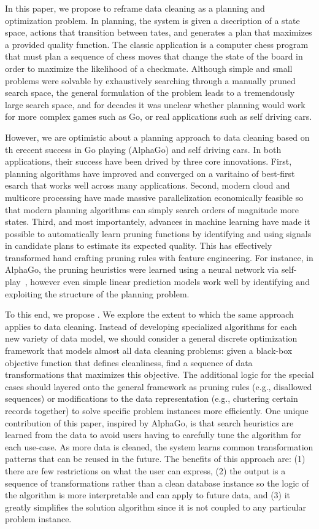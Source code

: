 In this paper, we propose to reframe data cleaning as a planning and optimization problem.  In planning, the system is given a dsecription of a state space, actions that transition between tates, and generates a plan that maximizes a provided quality function. The classic application is a computer chess program that must plan a sequence of chess moves that change the state of the board in order to maximize the likelihood of a checkmate. Although simple and small problems were solvable by exhaustively searching through a manually pruned search space, the general formulation of the problem leads to a tremendously large search space, and for decades it was unclear whether planning would work for more complex games such as Go, or real applications such as self driving cars.

However, we are optimistic about a planning approach to data cleaning based on th erecent success in Go playing (AlphaGo) and self driving cars.  In both applications, their success have been drived by three core innovations.  First, planning algorithms have improved and converged on a varitaino of best-first esarch that works well across many applications.  Second, modern cloud and multicore processing have made massive parallelization economically feasible so that modern planning algorithms can simply search orders of magnitude more states.  Third, and most importantely, advances in machine learning have made it possible to automatically learn pruning functions by identifying and using signals in candidate plans to estimate its expected quality.  This has effectively transformed hand crafting pruning rules with feature engineering.  For instance, in AlphaGo, the pruning heuristics were learned using a neural network via self-play~\cite{}, however even simple linear prediction models work well by identifying and exploiting the structure of the planning problem.

To this end, we propose \sys.  
We explore the extent to which the same approach applies to data cleaning.
Instead of developing specialized algorithms for each new variety of data model, we should consider a general discrete optimization framework that models almost all data cleaning problems: given a black-box objective function that defines cleanliness, find a sequence of data transformations that maximizes this objective.
The additional logic for the special cases should layered onto the general framework as pruning rules (e.g., disallowed sequences) or modifications to the data representation (e.g., clustering certain records together) to solve specific problem instances more efficiently.
One unique contribution of this paper, inspired by AlphaGo, is that search heuristics are learned from the data to avoid users having to carefully tune the algorithm for each use-case.
As more data is cleaned, the system learns common transformation patterns that can be reused in the future. 
The benefits of this approach are: (1) there are few restrictions on what the user can express, (2) the output is a sequence of transformations rather than a clean database instance so the logic of the algorithm is more interpretable and can apply to future data, and (3) it greatly simplifies the solution algorithm since it is not coupled to any particular problem instance.

